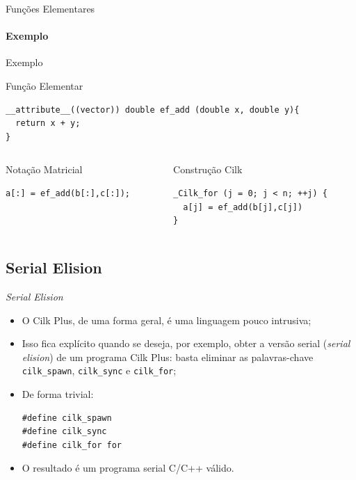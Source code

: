 \documentclass{beamer}
\begin{document}
\begin{frame}[fragile]{Funções Elementares}
\framesubtitle{Exemplo}
\begin{scriptsize}
\begin{block}{Exemplo}
\begin{block}{Função Elementar}
\begin{lstlisting}
__attribute__((vector)) double ef_add (double x, double y){
  return x + y;
}
\end{lstlisting}
\end{block}
\begin{columns}
\begin{column}{0.4\textwidth}
\begin{block}{Notação Matricial}
\begin{lstlisting}
a[:] = ef_add(b[:],c[:]);
\end{lstlisting}
\end{block}

\end{column}
\begin{column}{0.4\textwidth}
\begin{block}{Construção Cilk}
\begin{lstlisting}
_Cilk_for (j = 0; j < n; ++j) {
  a[j] = ef_add(b[j],c[j])
}
\end{lstlisting}
\end{block}
\end{column}
\end{columns}

\end{block}
\end{scriptsize}
\end{frame}

\subsection{Serial Elision}
\begin{frame}[fragile]{\textit{Serial Elision}}
\begin{itemize}
    \item O Cilk Plus, de uma forma geral, é uma linguagem pouco intrusiva;
    \item Isso fica explícito quando se deseja, por exemplo, obter a versão
    serial (\textit{serial elision}) de um programa Cilk Plus: basta eliminar as
    palavras-chave \texttt{cilk\_spawn}, \texttt{cilk\_sync} e
    \texttt{cilk\_for};
    \item De forma trivial:
\begin{lstlisting}
#define cilk_spawn
#define cilk_sync
#define cilk_for for
\end{lstlisting}
    \item O resultado é um programa serial C/C++ válido.
\end{itemize}
\end{frame}
\end{document}
